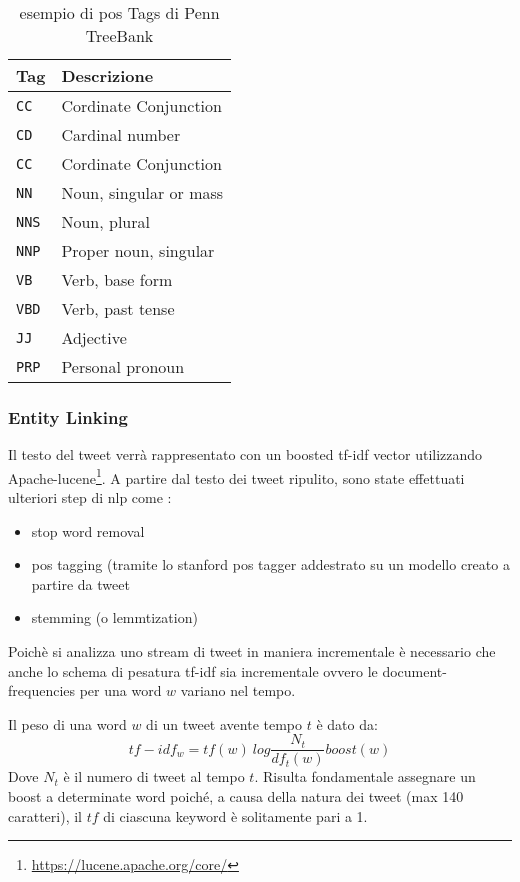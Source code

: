 \begin{table}[]
\centering
\caption{esempio di pos Tags di Penn TreeBank}
\label{tabPosTags}
\begin{tabular}{ll}
\hline
 \textbf{Tag}& \textbf{Descrizione}\\ \hline
\texttt{CC}  & {Cordinate Conjunction}  \\ \hline
\texttt{CD}  & {Cardinal number}  \\ \hline
\texttt{CC}  & {Cordinate Conjunction}  \\ \hline
\texttt{NN}  & {Noun, singular or mass}  \\ \hline
\texttt{NNS}  & {Noun, plural}  \\ \hline
\texttt{NNP}  & {Proper noun, singular}  \\ \hline
\texttt{VB}  & {Verb, base form}  \\ \hline
\texttt{VBD}  & {Verb, past tense}  \\ \hline
\texttt{JJ}  & {Adjective}  \\ \hline
\texttt{PRP}  & {Personal pronoun}  \\ \hline
\end{tabular}
\end{table}
\subsubsection{Entity Linking} 


 



Il testo del tweet verrà rappresentato con un boosted tf-idf vector utilizzando Apache-lucene\footnote{\href{https://lucene.apache.org/core/}{https://lucene.apache.org/core/}}. 
A partire dal testo dei tweet ripulito, sono state effettuati ulteriori step di nlp come :
\begin{itemize}
\item stop word removal
\item pos tagging (tramite lo stanford pos tagger addestrato su un modello  creato a partire da tweet
\item stemming (o lemmtization)
\end{itemize}
Poich\`e si analizza uno stream di tweet in maniera incrementale è necessario che anche lo schema di pesatura tf-idf sia incrementale ovvero le document-frequencies per una word $w$ variano nel tempo. 

Il peso di una word $w$ di un tweet avente tempo $t$ è dato da:
\begin{equation}
tf-idf_w=tf(w)\ log\frac{N_t}{df_t(w)}boost(w)
\end{equation}
Dove $N_t$ è il numero di tweet al tempo $t$.
Risulta fondamentale assegnare un boost a determinate word poiché, a causa della natura dei tweet (max 140 caratteri), il $tf$ di ciascuna keyword è solitamente pari a 1.  


